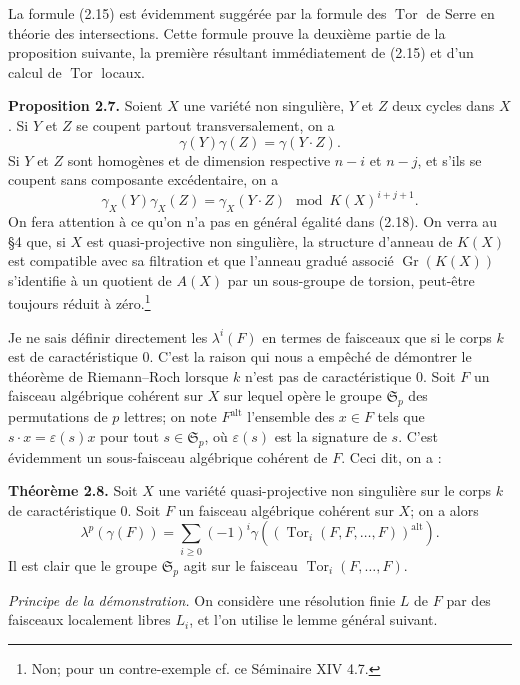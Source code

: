 \documentclass[11pt]{article}
\newcommand{\Gr}{\operatorname{Gr}}
\newcommand{\Tor}{\operatorname{Tor}}
\providecommand{\Gr}{\operatorname{Gr}}
\providecommand{\Tor}{\operatorname{Tor}}
\providecommand{\Gr}{\operatorname{G}}
\begin{document}
La formule (2.15) est évidemment suggérée par la formule des $\Tor$ de Serre en théorie des intersections. Cette formule prouve la deuxième partie de la proposition suivante, la première résultant immédiatement de (2.15) et d'un calcul de $\Tor$ locaux.

\textbf{Proposition 2.7.} Soient $X$ une variété non singulière, $Y$ et $Z$ deux cycles dans $X$. Si $Y$ et $Z$ se coupent partout transversalement, on a
\begin{equation}\tag{2.17}
 \gamma(Y)\gamma(Z)=\gamma(Y\cdot Z).
\end{equation}
Si $Y$ et $Z$ sont homogènes et de dimension respective $n-i$ et $n-j$, et s'ils se coupent sans composante excédentaire, on a
\begin{equation}\tag{2.18}
 \gamma_X(Y)\gamma_X(Z)=\gamma_X(Y\cdot Z)\mod K(X)^{i+j+1}.
\end{equation}
On fera attention à ce qu'on n'a pas en général égalité dans (2.18). On verra au \S 4 que, si $X$ est quasi-projective non singulière, la structure d'anneau de $K(X)$ est compatible avec sa filtration et que l'anneau gradué associé $\Gr(K(X))$ s'identifie à un quotient de $A(X)$ par un sous-groupe de torsion, peut-être toujours réduit à zéro.\footnote{Non; pour un contre-exemple cf. ce Séminaire XIV 4.7.}

Je ne sais définir directement les $\lambda^i(F)$ en termes de faisceaux que si le corps $k$ est de caractéristique $0$. C'est la raison qui nous a empêché de démontrer le théorème de Riemann--Roch lorsque $k$ n'est pas de caractéristique $0$. Soit $F$ un faisceau algébrique cohérent sur $X$ sur lequel opère le groupe $\mathfrak S_p$ des permutations de $p$ lettres; on note $F^{\mathrm{alt}}$ l'ensemble des $x\in F$ tels que $s\cdot x=\varepsilon(s)x$ pour tout $s\in\mathfrak S_p$, où $\varepsilon(s)$ est la signature de $s$. C'est évidemment un sous-faisceau algébrique cohérent de $F$. Ceci dit, on a :

\textbf{Théorème 2.8.} Soit $X$ une variété quasi-projective non singulière sur le corps $k$ de caractéristique $0$. Soit $F$ un faisceau algébrique cohérent sur $X$; on a alors
\begin{equation}\tag{2.19}
 \lambda^p(\gamma(F))=\sum_{i\geq0}(-1)^i\gamma\left((\Tor_i(F,F,\ldots,F))^{\mathrm{alt}}\right).
\end{equation}
Il est clair que le groupe $\mathfrak S_p$ agit sur le faisceau $\Tor_i(F,\ldots,F)$.

\emph{Principe de la démonstration.} On considère une résolution finie $L$ de $F$ par des faisceaux localement libres $L_i$, et l'on utilise le lemme général suivant.
\end{document}
